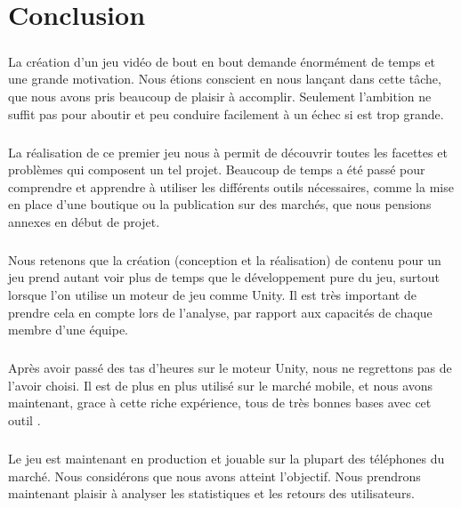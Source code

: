 \chapter{Conclusion}

\paragraph{}
La création d’un jeu vidéo de bout en bout demande énormément de temps et une grande motivation. Nous étions conscient en nous lançant dans cette tâche, que nous avons pris beaucoup de plaisir à accomplir. Seulement l’ambition ne suffit pas pour aboutir et peu conduire facilement à un échec si est trop grande.

\paragraph{}
La réalisation de ce premier jeu nous à permit de découvrir toutes les facettes et problèmes qui composent un tel projet. Beaucoup de temps a été passé pour comprendre et apprendre à utiliser les différents outils nécessaires, comme la mise en place d’une boutique ou la publication sur des marchés, que nous pensions annexes en début de projet.

\paragraph{}
Nous retenons que la création (conception et la réalisation) de contenu pour un jeu prend autant voir plus de temps que le développement pure du jeu, surtout lorsque l'on utilise un moteur de jeu comme Unity. Il est très important de prendre cela en compte lors de l’analyse, par rapport aux capacités de chaque membre d'une équipe.

\paragraph{}
Après avoir passé des tas d'heures sur le moteur Unity, nous ne regrettons pas de l'avoir choisi. Il est de plus en plus utilisé sur le marché mobile, et nous avons maintenant, grace à cette riche expérience, tous de très bonnes bases avec cet outil .

\paragraph{}
Le jeu est maintenant en production et jouable sur la plupart des téléphones du marché. Nous considérons que nous avons atteint l'objectif. Nous prendrons maintenant plaisir à analyser les statistiques et les retours des utilisateurs.

